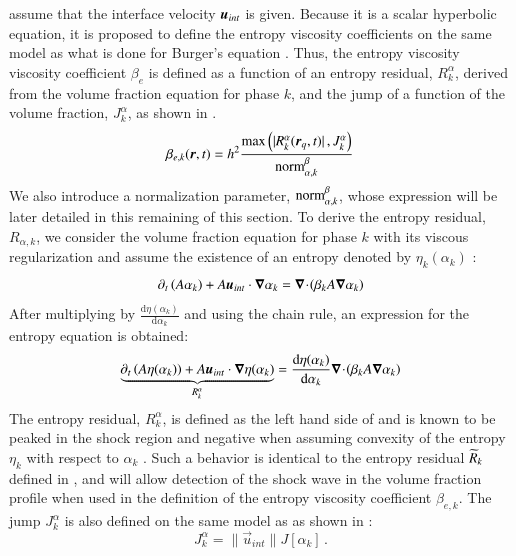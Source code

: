\documentclass[preprint,10pt]{elsarticle}
\begin{document}
assume that the interface 
velocity $\boldsymbol u_{int}$ is given. Because it is a scalar hyperbolic equation, it is proposed to define the entropy viscosity coefficients on the same model as 
what is done for Burger's equation 
\cite{jlg1, jlg2}. Thus, the entropy viscosity viscosity coefficient $\beta_e$ is defined as a function of an entropy residual, $R_{k}^\alpha$, derived from the 
volume fraction equation for 
phase $k$, and the jump of a function of the volume fraction, $J_k^\alpha$, as shown in .
%
\begin{align}\label{eq:def-beta-sen-sect4}
\beta_{e,k}( \boldsymbol r, t) = h^2 \frac{\max\left( | R_{k}^\alpha(\boldsymbol r_q,t) |\,,  J_k^\alpha \right)}{\textrm{norm}_{\alpha, k}^\beta} \,
\end{align}
%
We also introduce a normalization parameter, $\textrm{norm}_{\alpha,k}^\beta$, whose expression will be later detailed in this remaining of this section. To derive the 
entropy residual, $R_{\alpha,k}$, 
we consider the volume fraction equation for phase $k$ with its viscous regularization and assume the existence of an entropy denoted by $\eta_k(\alpha_k)$ 
\cite{Leveque}:
%
\begin{equation}\label{eq:vf-sem-sct4}
\partial_t \left(A \alpha_k \right) + A \boldsymbol u_{int} \cdot \boldsymbol\nabla \alpha_k = \boldsymbol\nabla\! \cdot \! \left( \beta_k A \boldsymbol\nabla \alpha_k \right)
\end{equation}
% 
After multiplying by $\frac{\text{d} \eta (\alpha_k)}{\text{d} \alpha_k}$ and using the chain rule, an expression for the entropy equation is obtained:
%
\begin{equation}\label{eq:vf-sem2-sct4}
\underbrace{\partial_t \left(A \eta(\alpha_k) \right) + A \boldsymbol u_{int} \cdot \boldsymbol\nabla \eta(\alpha_k)}_{R_{k}^\alpha} = \frac{\text{d} \eta (\alpha_k)}{\text{d} \alpha_k} 
\boldsymbol\nabla\! \cdot \! \left( \beta_k A \boldsymbol\nabla \alpha_k \right)
\end{equation}
% 
The entropy residual, $R_{k}^\alpha$, is defined as the left hand side of  and is known to be peaked in the shock region and negative 
when assuming convexity of the 
entropy $\eta_k$ with respect to $\alpha_k$ \cite{Leveque}. Such a behavior is identical to the entropy residual $\widetilde{R}_k$ defined in , 
and will allow detection of the 
shock wave in the volume fraction profile when used in the definition of the entropy viscosity coefficient $\beta_{e,k}$. The jump $J_k^\alpha$ is also defined 
on the same model as  as shown in :
\begin{equation}\label{eq:jump-alpha}
J_k^\alpha = \| \vec{u}_{int} \| J[\alpha_k] \,.
\end{equation}
\end{document}
